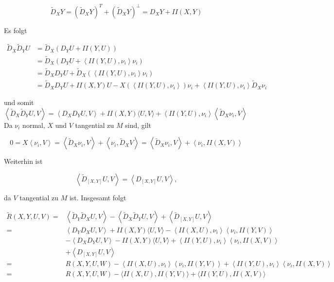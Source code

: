 \documentclass[10pt]{article}
\begin{document}
$$
\tilde{D}_{X} Y=\left(\tilde{D}_{X} Y\right)^{T}+\left(\tilde{D}_{X} Y\right)^{\perp}=D_{X} Y+I I(X, Y)
$$

Es folgt

$$
\begin{aligned}
\tilde{D}_{X} \tilde{D}_{Y} U & =\tilde{D}_{X}\left(D_{Y} U+I I(Y, U)\right) \\
& =\tilde{D}_{X}\left(D_{Y} U+\left\langle I I(Y, U), \nu_{i}\right\rangle \nu_{i}\right) \\
& =\tilde{D}_{X} D_{Y} U+\tilde{D}_{X}\left(\left\langle I I(Y, U), \nu_{i}\right\rangle \nu_{i}\right) \\
& =\tilde{D}_{X} D_{Y} U+I I(X, Y) U-X\left(\left\langle I I(Y, U), \nu_{i}\right\rangle\right) \nu_{i}+\left\langle I I(Y, U), \nu_{i}\right\rangle \tilde{D}_{X} \nu_{i}
\end{aligned}
$$

und somit\\
$\left\langle\tilde{D}_{X} \tilde{D}_{Y} U, V\right\rangle=\left\langle D_{X} D_{Y} U, V\right\rangle+I I(X, Y)\langle U, V\rangle+\left\langle I I(Y, U), \nu_{i}\right\rangle\left\langle\tilde{D}_{X} \nu_{i}, V\right\rangle$\\
Da $\nu_{i}$ normal, $X$ und $V$ tangential zu $M$ sind, gilt

$$
0=X\left\langle\nu_{i}, V\right\rangle=\left\langle\tilde{D}_{X} \nu_{i}, V\right\rangle+\left\langle\nu_{i}, \tilde{D}_{X} V\right\rangle=\left\langle\tilde{D}_{X} \nu_{i}, V\right\rangle+\left\langle\nu_{i}, I I(X, V)\right\rangle
$$

Weiterhin ist

$$
\left\langle\tilde{D}_{[X, Y]} U, V\right\rangle=\left\langle D_{[X, Y]} U, V\right\rangle,
$$

da $V$ tangential zu $M$ ist. Insgesamt folgt

$$
\begin{aligned}
\tilde{R}(X, Y, U, V)= & \left\langle\tilde{D}_{Y} \tilde{D}_{X} U, V\right\rangle-\left\langle\tilde{D}_{X} \tilde{D}_{Y} U, V\right\rangle+\left\langle\tilde{D}_{[X, Y]} U, V\right\rangle \\
= & \left\langle D_{Y} D_{X} U, V\right\rangle+I I(X, Y)\langle U, V\rangle-\left\langle I I(X, U), \nu_{i}\right\rangle\left\langle\nu_{i}, I I(Y, V)\right\rangle \\
& -\left\langle D_{X} D_{Y} U, V\right\rangle-I I(X, Y)\langle U, V\rangle+\left\langle I I(Y, U), \nu_{i}\right\rangle\left\langle\nu_{i}, I I(X, V)\right\rangle \\
& +\left\langle D_{[X, Y]} U, V\right\rangle \\
= & R(X, Y, U, W)-\left\langle I I(X, U), \nu_{i}\right\rangle\left\langle\nu_{i}, I I(Y, V)\right\rangle+\left\langle I I(Y, U), \nu_{i}\right\rangle\left\langle\nu_{i}, I I(X, V)\right\rangle \\
= & R(X, Y, U, W)-\langle I I(X, U), I I(Y, V)\rangle+\langle I I(Y, U), I I(X, V)\rangle
\end{aligned}
$$
\end{document}
